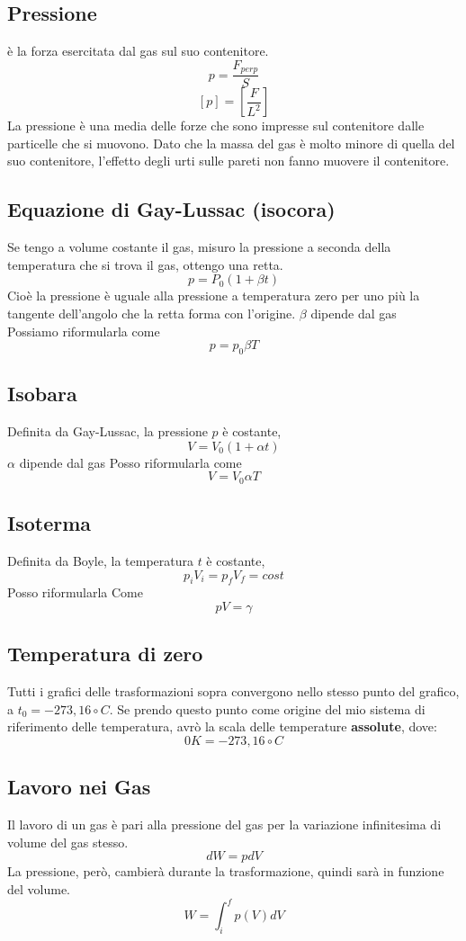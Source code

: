 \documentclass[a4paper]{report}
\begin{document}
  \subsection{Pressione}
  è la forza esercitata dal gas sul suo contenitore.
  $$p = \frac{F_{perp}}{S}$$
  $$[p]=[\frac{F}{L^2}]$$
  La pressione è una media delle forze che sono impresse sul contenitore dalle particelle che si muovono. Dato che la massa del gas è molto minore di quella del suo contenitore, l'effetto degli urti sulle pareti non fanno muovere il contenitore.
  \subsection{Equazione di Gay-Lussac (isocora)}
  Se tengo a volume costante il gas, misuro la pressione a seconda della temperatura che si trova il gas, ottengo una retta.
  $$ p = P_0 (1 + \beta t)$$
  Cioè la pressione è uguale alla pressione a temperatura zero per uno più la tangente dell'angolo che la retta forma con l'origine. $\beta$ dipende dal gas\\
  Possiamo riformularla come
  $$ p = p_0 \beta T$$

  \subsection{Isobara}
  Definita da Gay-Lussac, la pressione $p$ è costante,
  $$ V = V_0(1 + \alpha t) $$
  $\alpha$ dipende dal gas
  Posso riformularla come
  $$V = V_0 \alpha T$$
  \subsection{Isoterma}
  Definita da Boyle, la temperatura $t$ è costante,
  $$ p_i V_i = p_f V_f = cost$$
  Posso riformularla Come
  $$pV = \gamma $$
  \subsection{Temperatura di zero}
  Tutti i grafici delle trasformazioni sopra convergono nello stesso punto del grafico, a $t_0 = -273,16\circ C$. Se prendo questo punto come origine del mio sistema di riferimento delle temperatura, avrò la scala delle temperature \textbf{assolute}, dove:
  $$0 K = -273,16 \circ C$$


  \subsection{Lavoro nei Gas}
  Il lavoro di un gas è pari alla pressione del gas per la variazione infinitesima di volume del gas stesso.
  $$ dW = p dV$$
  La pressione, però, cambierà durante la trasformazione, quindi sarà in funzione del volume.
  $$ W = \int_i^f p(V)dV $$
\end{document}
